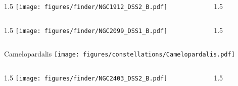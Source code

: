 \documentclass[final]{beamer}
\newlength{\colwidth}
\begin{document}
\begin{frame}[t]{}
    \begin{columns}[T]
        \begin{column}{1.5\colwidth}
            \centering
            \texttt{[image: figures/finder/NGC1912\_DSS2\_B.pdf]}
        \end{column}
        \begin{column}{1.5\colwidth}
            \Large
            
        \end{column}
    \end{columns}
    \vspace{\fill}
    \begin{columns}[T]
        \begin{column}{1.5\colwidth}
            \centering
            \texttt{[image: figures/finder/NGC2099\_DSS1\_B.pdf]}
        \end{column}
        \begin{column}{1.5\colwidth}
            \Large
            
        \end{column}
    \end{columns}
\end{frame}


\begin{frame}[t]{\LARGE Camelopardalis}
    \centering
    \texttt{[image: figures/constellations/Camelopardalis.pdf]}
\end{frame}


\begin{frame}[t]{}
    \begin{columns}[T]
        \begin{column}{1.5\colwidth}
            \centering
            \texttt{[image: figures/finder/NGC2403\_DSS2\_B.pdf]}
        \end{column}
        \begin{column}{1.5\colwidth}
            \Large
            
        \end{column}
    \end{columns}
    \vspace{\fill}
\end{frame}
\end{document}
